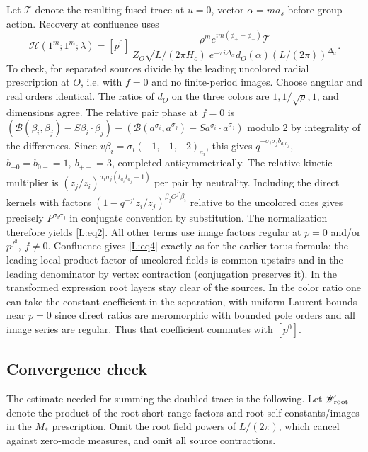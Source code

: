 Let \(\mathcal T\) denote the resulting fused trace at \(u=0\), vector \(\alpha=m a_s\) before group action. Recovery at confluence uses
\begin{equation}
 \mathcal H(1^m;1^m;\lambda)
  =[p^0]\,
 \frac{\rho^m e^{im(\phi_++\phi_-)}\mathcal T}
 {Z_O\sqrt{L/(2\pi H_o)}\ e^{-\pi i\Delta_\alpha}
 d_O(\alpha)(L/(2\pi))^{\Delta_\alpha}} .\label{L:eq4}
\end{equation}
To check, for separated sources divide by the leading uncolored radial prescription at \(O\), i.e. with \(f=0\) and no finite-period images. Choose angular and real orders identical. The ratios of \(d_O\) on the three colors are \(1,1/\sqrt\rho,1\), and dimensions agree. The relative pair phase at \(f=0\) is \((\mathcal B(\beta_i,\beta_j)-S\beta_i\cdot\beta_j)-(\mathcal B(a^{\sigma_i},a^{\sigma_j})-S a^{\sigma_i}\cdot a^{\sigma_j})\) modulo 2 by integrality of the differences. Since \(v\beta_i=\sigma_i(-1,-1,-2)_{a_i}\), this gives \(q^{-\sigma_i\sigma_j b_{a_i a_j}}\), \(b_{+0}=b_{0-}=1,\ b_{+-}=3\), completed antisymmetrically. The relative kinetic multiplier is \((z_j/z_i)^{\sigma_i\sigma_j(t_{a_i}t_{a_j}-1)}\) per pair by neutrality. Including the direct kernels with factors \((1-q^{-j'} z_i/z_j)^{\beta_j O^{j'}\beta_i}\) relative to the uncolored ones gives precisely \(P^{\sigma_i\sigma_j}\) in conjugate convention by substitution. The normalization therefore yields \eqref{L:eq2}. All other terms use image factors regular at \(p=0\) and/or \(p^{f^2},\ f\ne0\). Confluence gives \eqref{L:eq4} exactly as for the earlier torus formula: the leading local product factor of uncolored fields is common upstairs and in the leading denominator by vertex contraction (conjugation preserves it). In the transformed expression root layers stay clear of the sources. In the color ratio one can take the constant coefficient in the separation, with uniform Laurent bounds near \(p=0\) since direct ratios are meromorphic with bounded pole orders and all image series are regular. Thus that coefficient commutes with \([p^0]\).

\subsection{Convergence check}\label{L:step11}

The estimate needed for summing the doubled trace is the following.
Let $\mathscr W_{\rm root}$ denote the product of the root short-range
factors and root self constants/images in the $M_*$ prescription. Omit
the root field powers of $L/(2\pi)$, which cancel against zero-mode
measures, and omit all source contractions.

